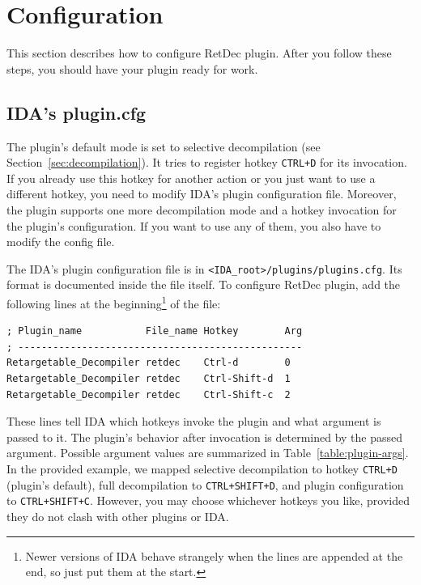 \documentclass[pdftex, a4paper,12pt, oneside, svgnames]{article}
\begin{document}
\section{Configuration}
\label{sec:configuration}
This section describes how to configure RetDec plugin. After you follow these steps, you should have your plugin ready for work.

\subsection{IDA's plugin.cfg}
\label{sec:config:plugin-cfg}
The plugin's default mode is set to selective decompilation (see Section~\ref{sec:decompilation}). It tries to register hotkey \texttt{CTRL+D} for its invocation. If you already use this hotkey for another action or you just want to use a different hotkey, you need to modify IDA's plugin configuration file. Moreover, the plugin supports one more decompilation mode and a hotkey invocation for the plugin's configuration. If you want to use any of them, you also have to modify the config file.

The IDA's plugin configuration file is in \texttt{<IDA_root>/plugins/plugins.cfg}. Its format is documented inside the file itself. To configure RetDec plugin, add the following lines at the beginning\footnote{Newer versions of IDA behave strangely when the lines are appended at the end, so just put them at the start.} of the file:
\begin{verbatim}
; Plugin_name           File_name Hotkey        Arg
; -------------------------------------------------
Retargetable_Decompiler retdec    Ctrl-d        0
Retargetable_Decompiler retdec    Ctrl-Shift-d  1
Retargetable_Decompiler retdec    Ctrl-Shift-c  2
\end{verbatim}
These lines tell IDA which hotkeys invoke the plugin and what argument is passed to it. The plugin's behavior after invocation is determined by the passed argument. Possible argument values are summarized in Table~\ref{table:plugin-args}. In the provided example, we mapped selective decompilation to hotkey \texttt{CTRL+D} (plugin's default), full decompilation to \texttt{CTRL+SHIFT+D}, and plugin configuration to \texttt{CTRL+SHIFT+C}. However, you may choose whichever hotkeys you like, provided they do not clash with other plugins or IDA.
\end{document}
